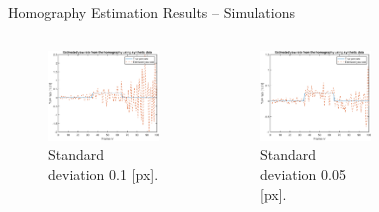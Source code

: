 \documentclass{beamer}
\begin{document}
\begin{frame}{Homography Estimation Results -- Simulations}
\begin{columns}[T]
\begin{figure}
		\includegraphics[height=0.35\textheight]{Hom/rect_1e-1}
		\vspace{-1.25em}
		\caption{Standard deviation 0.1 [px].}
	\end{figure}
	\begin{figure}
		\includegraphics[height=0.35\textheight]{Hom/rect_5e-2}
		\vspace{-1.25em}
		\caption{Standard deviation 0.05 [px].}
	\end{figure}
	\vspace{-2.5em}
	\begin{figure}

\end{figure}
\end{columns}
\end{frame}
\end{document}
